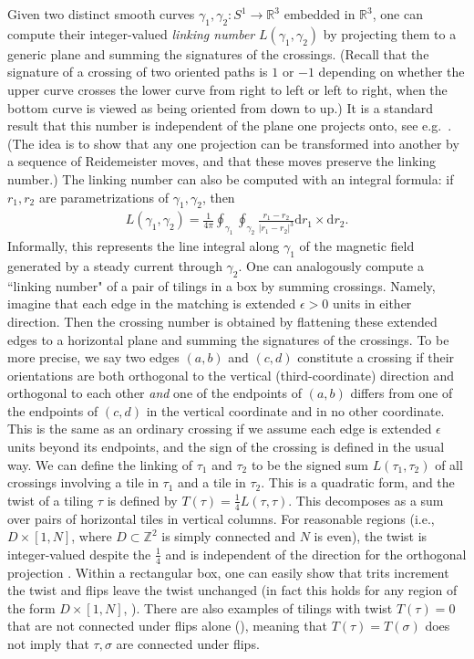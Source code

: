 \documentclass[11pt]{article}
\theoremstyle{remark}
\theoremstyle{definition}
\newcommand{\m}[1]{\mathbb{#1}}
\newcommand{\dd}{\mathrm{d}}
\begin{document}
Given two distinct smooth curves $\gamma_1,\gamma_2:S^1\to \m R^3$ embedded in $\m R^3$, one can compute their integer-valued \textit{linking number} $L(\gamma_1,\gamma_2)$ by projecting them to a generic plane and summing the signatures of the crossings. (Recall that the signature of a crossing of two oriented paths is $1$ or $-1$ depending on whether the upper curve crosses the lower curve from right to left or left to right, when the bottom curve is viewed as being oriented from down to up.) %
It is a standard result that this number is independent of the plane one projects onto, see e.g.\ \cite[pages 20-21]{adams1994knot}. (The idea is to show that any one projection can be transformed into another by a sequence of Reidemeister moves, and that these moves preserve the linking number.) The linking number can also be computed with an integral formula: if $ r_1, r_2$ are parametrizations of $\gamma_1,\gamma_2$, then
\begin{align*}
    L(\gamma_1,\gamma_2) = \frac{1}{4\pi} \oint_{\gamma_1}\oint_{\gamma_2} \frac{ r_1 -  r_2}{| r_1- r_2|^3} \dd  r_1 \times \dd  r_2.
\end{align*}
Informally, this represents the line integral along $\gamma_1$ of the magnetic field generated by a steady current through $\gamma_2$. One can analogously compute a ``linking number" of a pair of tilings in a box by summing crossings. Namely, imagine that each edge in the matching is extended $\epsilon>0$ units in either direction. Then the crossing number is obtained by flattening these extended edges to a horizontal plane and summing the signatures of the crossings.  To be more precise, we say two edges $(a,b)$ and $(c,d)$ constitute a crossing if their orientations are both orthogonal to the vertical (third-coordinate) direction and orthogonal to each other {\em and} one of the endpoints of $(a,b)$ differs from one of the endpoints of $(c,d)$ in the vertical coordinate and in no other coordinate. This is the same as an ordinary crossing if we assume each edge is extended $\epsilon$ units beyond its endpoints, and the sign of the crossing is defined in the usual way. We can define the linking of $\tau_1$ and $\tau_2$ to be the signed sum $L(\tau_1, \tau_2)$ of all crossings involving a tile in $\tau_1$ and a tile in $\tau_2$.  This is a quadratic form, and the twist of a tiling $\tau$ is defined by $T(\tau)=  \frac{1}{4}L(\tau, \tau)$. This decomposes as a sum over pairs of horizontal tiles in vertical columns. For reasonable regions (i.e., $D\times [1,N]$, where $D\subset \m Z^2$ is simply connected and $N$ is even), the twist is integer-valued despite the $\frac{1}{4}$ and is independent of the direction for the orthogonal projection \cite[Proposition 6.4]{milet2014domino}. Within a rectangular box, one can easily show that trits increment the twist and flips leave the twist unchanged (in fact this holds for any region of the form $D\times [1,N]$, \cite[Theorem 1]{milet2014domino}). There are also examples of tilings with twist $T(\tau)=0$ that are not connected under flips alone (\cite[Figure 7]{MR4245261}), meaning that $T(\tau)=T(\sigma)$ does not imply that $\tau,\sigma$ are connected under flips. 
\end{document}
